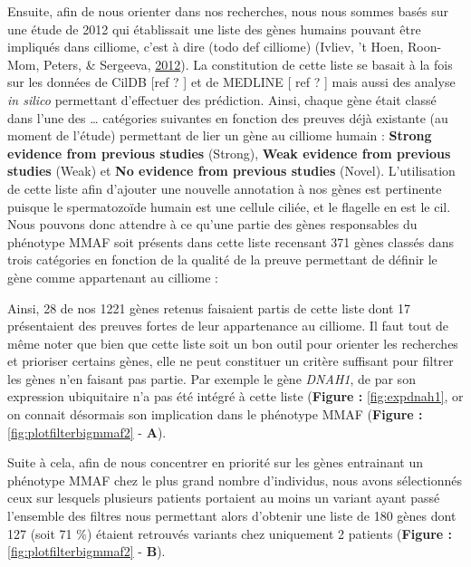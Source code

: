 \documentclass[12pt,twoside]{reedthesis}
\theoremstyle{definition}
\theoremstyle{definition}
\theoremstyle{remark}
\begin{document}
  Ensuite, afin de nous orienter dans nos recherches, nous nous sommes
  basés sur une étude de 2012 qui établissait une liste des gènes humains
  pouvant être impliqués dans cilliome, c'est à dire (todo def cilliome)
  (Ivliev, 't Hoen, Roon-Mom, Peters, \& Sergeeva,
  \protect\hyperlink{ref-Ivliev2012}{2012}). La constitution de cette
  liste se basait à la fois sur les données de CilDB {[}ref ? {]} et de
  MEDLINE {[} ref ? {]} mais aussi des analyse \emph{in silico} permettant
  d'effectuer des prédiction. Ainsi, chaque gène était classé dans l'une
  des \ldots{} catégories suivantes en fonction des preuves déjà existante
  (au moment de l'étude) permettant de lier un gène au cilliome humain :
  \textbf{Strong evidence from previous studies} (Strong), \textbf{Weak
  evidence from previous studies} (Weak) et \textbf{No evidence from
  previous studies} (Novel). L'utilisation de cette liste afin d'ajouter
  une nouvelle annotation à nos gènes est pertinente puisque le
  spermatozoïde humain est une cellule ciliée, et le flagelle en est le
  cil. Nous pouvons donc attendre à ce qu'une partie des gènes
  responsables du phénotype MMAF soit présents dans cette liste recensant
  371 gènes classés dans trois catégories en fonction de la qualité de la
  preuve permettant de définir le gène comme appartenant au cilliome :
  
  Ainsi, 28 de nos 1221 gènes retenus faisaient partis de cette liste dont
  17 présentaient des preuves fortes de leur appartenance au cilliome. Il
  faut tout de même noter que bien que cette liste soit un bon outil pour
  orienter les recherches et prioriser certains gènes, elle ne peut
  constituer un critère suffisant pour filtrer les gènes n'en faisant pas
  partie. Par exemple le gène \emph{DNAH1}, de par son expression
  ubiquitaire n'a pas été intégré à cette liste (\textbf{Figure :
  }\ref{fig:expdnah1}, or on connait désormais son implication dans le
  phénotype MMAF (\textbf{Figure : }\ref{fig:plotfilterbigmmaf2} -
  \textbf{A}).
  
  Suite à cela, afin de nous concentrer en priorité sur les gènes
  entrainant un phénotype MMAF chez le plus grand nombre d'individus, nous
  avons sélectionnés ceux sur lesquels plusieurs patients portaient au
  moins un variant ayant passé l'ensemble des filtres nous permettant
  alors d'obtenir une liste de 180 gènes dont 127 (soit 71 \%) étaient
  retrouvés variants chez uniquement 2 patients (\textbf{Figure :
  }\ref{fig:plotfilterbigmmaf2} - \textbf{B}).
  
  \newpage
  
\end{document}
